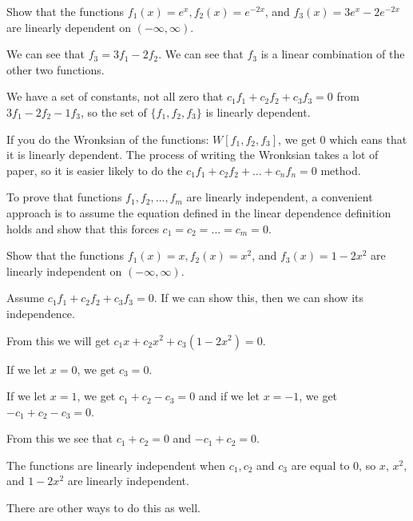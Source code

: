 \documentclass[../diffeq.tex]{subfiles}
\begin{document}
\pagebreak
\begin{example}
    Show that the functions $f_1(x)=e^x, f_2(x)=e^{-2x}$, and $f_3(x)=3e^x-2e^{-2x}$ are linearly dependent on $(-\infty,\infty)$.

    We can see that $f_3=3f_1-2f_2$. We can see that $f_3$ is a linear combination of the other two functions.

    We have a set of constants, not all zero that $c_1f_1+c_2f_2+c_3f_3=0$ from $3f_1-2f_2-1f_3$, so the set of $\{f_1,f_2,f_3\}$ is linearly dependent.

    If you do the Wronksian of the functions: $W[f_1,f_2,f_3]$, we get 0 which eans that it is linearly dependent. The process of writing the Wronksian takes a lot of paper, so it is easier likely to do the $c_1f_1+c_2f_2+\dots +c_nf_n=0$ method.
\end{example}

To prove that functions $f_1,f_2,\dots, f_m$ are linearly independent, a convenient approach is to assume the equation defined in the linear dependence definition holds and show that this forces $c_1=c_2=\dots = c_m =0$. 

\begin{example}
    Show that the functions $f_1(x)=x, f_2(x)=x^2$, and $f_3(x)=1-2x^2$ are linearly independent on $(-\infty,\infty)$.

    Assume $c_1f_1+c_2f_2+c_3f_3=0$. If we can show this, then we can show its independence.

    From this we will get $c_1x+c_2x^2+c_3(1-2x^2)=0$.

    If we let $x=0$, we get $c_3=0$.

    If we let $x=1$, we get $c_1+c_2-c_3=0$ and if we let $x=-1$, we get $-c_1+c_2-c_3=0$. 

    From this we see that $c_1+c_2=0$ and $-c_1+c_2=0$.

    The functions are linearly independent when $c_1,c_2$ and $c_3$ are equal to 0, so $x$, $x^2$, and $1-2x^2$ are linearly independent.

    There are other ways to do this as well.
\end{example}
\end{document}
